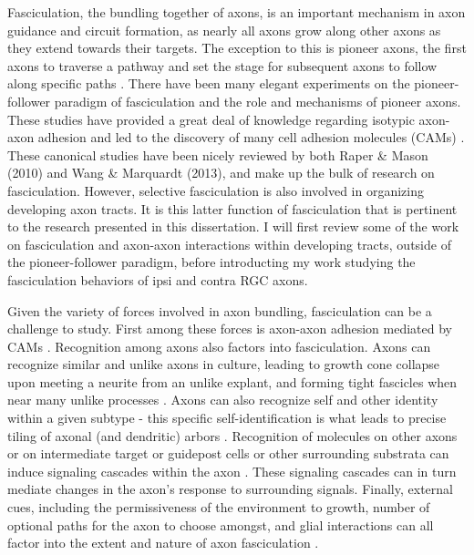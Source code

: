Fasciculation, the bundling together of axons, is an important mechanism in axon guidance and circuit formation, as nearly all axons grow along other axons as they extend towards their targets.
The exception to this is pioneer axons, the first axons to traverse a pathway and set the stage for subsequent axons to follow along specific paths \cite{raper2010cellular,wang2013axons}.
There have been many elegant experiments on the pioneer-follower paradigm of fasciculation and the role and mechanisms of pioneer axons.
These studies have provided a great deal of knowledge regarding isotypic axon-axon adhesion and led to the discovery of many cell adhesion molecules (CAMs) \cite{raper2010cellular,wang2013axons}.
These canonical studies have been nicely reviewed by both Raper \& Mason (2010) and Wang \& Marquardt (2013), and make up the bulk of research on fasciculation.
However, selective fasciculation is also involved in organizing developing axon tracts.
It is this latter function of fasciculation that is pertinent to the research presented in this dissertation.
I will first review some of the work on fasciculation and axon-axon interactions within developing tracts, outside of the pioneer-follower paradigm, before introducting my work studying the fasciculation behaviors of ipsi and contra RGC axons.

Given the variety of forces involved in axon bundling, fasciculation can be a challenge to study.
First among these forces is axon-axon adhesion mediated by CAMs \cite{wang2013axons,van1998adhesion}.
Recognition among axons also factors into fasciculation.
Axons can recognize similar and unlike axons in culture, leading to growth cone collapse upon meeting a neurite from an unlike explant, and forming tight fascicles when near many unlike processes \cite{kapfhammer1986selective}.
Axons can also recognize self and other identity within a given subtype - this specific self-identification is what leads to precise tiling of axonal (and dendritic) arbors \cite{grueber2010self}.
Recognition of molecules on other axons or on intermediate target or guidepost cells or other surrounding substrata can induce signaling cascades within the axon \cite{bashaw2010signaling,wang2013axons}.
These signaling cascades can in turn mediate changes in the axon's response to surrounding signals.
Finally, external cues, including the permissiveness of the environment to growth, number of optional paths for the axon to choose amongst, and glial interactions can all factor into the extent and nature of axon fasciculation \cite{wang2013axons}.

